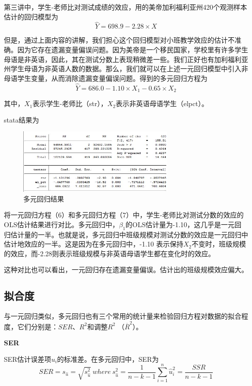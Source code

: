 \documentclass[cn,10pt,math=newtx,citestyle=gb7714-2015,bibstyle=gb7714-2015]{elegantbook}
\begin{document}
	第三讲中，学生-老师比对测试成绩的效应，用的美帝加利福利亚州420个观测样本估计的回归模型为
	\begin{equation}
		\hat{Y}=698.9-2.28\times{X}
	\end{equation}
	
	但是，通过上面内容的讲解，我们担心这个回归模型对小班教学效应的估计不准确。因为它存在遗漏变量偏误问题。因为美帝是一个移民国家，学校里有许多学生母语是非英语，因此，其在测试分数上表现稍微差一些。我们正好也有加利福利亚州学生母语为非英语人数的数据。那么，我们就可以在上述一元回归模型中引入非母语学生变量，从而消除遗漏变量偏误问题。得到的多元回归方程为
	\begin{equation}
		\hat{Y}=686.0-1.10\times{X_1}-0.65\times{X_2}
	\end{equation}
	
	其中，$X_1$表示学生-老师比（str），$X_2$表示非英语母语学生（elpct）。
	
	stata结果为
	\begin{figure}[htbp]
		\centering
		\includegraphics[width=0.7\textwidth]{mreg.jpg}
		\caption{多元回归结果}\label{fig:digit}
	\end{figure}
	
	将一元回归方程（6）和多元回归方程（7）中，学生-老师比对测试分数的效应的OLS估计结果进行对比。多元回归中，$\beta_1$的OLS估计量为-1.10，这几乎是一元回归估计量的一半。也就是说，多元回归中班级规模对测试分数的效应是一元回归中估计地效应的一半。这是因为在多元回归中，-1.10 表示保持$X_2$不变时，班级规模的效应，而-2.28则表示班级规模与非英语母语学生都在变化时的效应。
	
	这种对比也可以看出，一元回归存在遗漏变量偏误。估计出的班级规模效应偏大。
	
	\subsection{拟合度}
	与一元回归类似，多元回归也有三个常用的统计量来检验回归方程对数据的拟合程度，它们分别是：$SER$、$R^2$和调整$R^2$ （$\overline{R}^2$）。
	
	\textbf{SER}
	
	SER估计误差项$u_i$的标准差。在多元回归中，SER为
	\begin{equation}
		SER=s_{\hat{u}}=\sqrt{s_{\hat{u}}^2}~where~s_{\hat{u}}^2=\frac{1}{n-k-1}\sum_{i=1}^{n}{\hat{u}_i^2}=\frac{SSR}{n-k-1}
	\end{equation}
	
\end{document}
